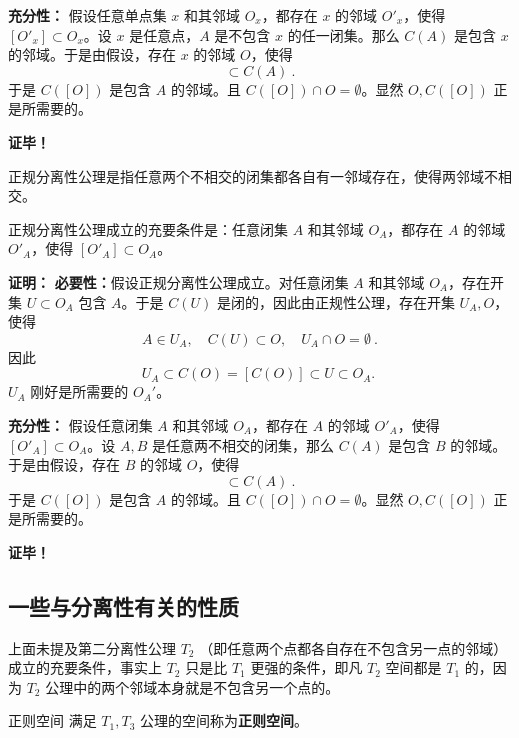 \textbf{充分性：} 假设任意单点集 $x$ 和其邻域 $O_x$，都存在 $x$ 的邻域 $ O'_x$，使得 $[O'_x]\subset O_x$。设 $x$ 是任意点，$A$ 是不包含 $x$ 的任一闭集。那么 $C(A)$ 是包含 $x$ 的邻域。于是由假设，存在 $x$ 的邻域 $O$，使得 
\begin{equation}
[O]\subset C(A)~.
\end{equation}
于是 $C([O])$ 是包含 $A$ 的邻域。且 $C([O])\cap O=\emptyset $。显然 $O,C([O])$ 正是所需要的。

\textbf{证毕！}


正规分离性公理是指任意两个不相交的闭集都各自有一邻域存在，使得两邻域不相交。

\begin{theorem}{}
正规分离性公理成立的充要条件是：任意闭集 $A$ 和其邻域 $O_A$，都存在 $A$ 的邻域 $ O'_A$，使得 $[O'_A]\subset O_A$。
\end{theorem}

\textbf{证明：}
\textbf{必要性：}假设正规分离性公理成立。对任意闭集 $A$ 和其邻域 $O_A$，存在开集 $U\subset O_A$ 包含 $A$。于是 $C(U)$ 是闭的，因此由正规性公理，存在开集 $U_A, O$，使得
\begin{equation}
A\in U_A,\quad C(U)\subset O,\quad U_A\cap O=\emptyset~.
\end{equation}
因此
\begin{equation}
U_A\subset C(O)=[C(O)]\subset U\subset O_A.~
\end{equation}
$U_A$ 刚好是所需要的 $O_A'$。

\textbf{充分性：} 假设任意闭集 $A$ 和其邻域 $O_A$，都存在 $A$ 的邻域 $ O'_A$，使得 $[O'_A]\subset O_A$。设 $A,B$ 是任意两不相交的闭集，那么 $C(A)$ 是包含 $B$ 的邻域。于是由假设，存在 $B$ 的邻域 $O$，使得 
\begin{equation}
[O]\subset C(A)~.
\end{equation}
于是 $C([O])$ 是包含 $A$ 的邻域。且 $C([O])\cap O=\emptyset $。显然 $O,C([O])$ 正是所需要的。

\textbf{证毕！}


\subsection{一些与分离性有关的性质}

上面未提及第二分离性公理 $T_2$ （即任意两个点都各自存在不包含另一点的邻域）成立的充要条件，事实上 $T_2$ 只是比 $T_1$ 更强的条件，即凡 $T_2$ 空间都是 $T_1$ 的，因为 $T_2$ 公理中的两个邻域本身就是不包含另一个点的。

\begin{definition}{正则空间}
满足 $T_1,T_3$ 公理的空间称为\textbf{正则空间}。
\end{definition}


